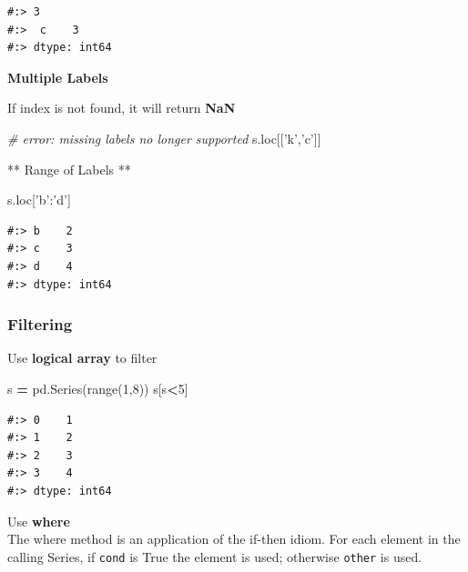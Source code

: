 \documentclass[
]{book}
\newenvironment{Shaded}{\begin{snugshade}}{\end{snugshade}}
\newcommand{\BuiltInTok}[1]{#1}
\newcommand{\CommentTok}[1]{\textcolor[rgb]{0.37,0.37,0.37}{\textit{#1}}}
\newcommand{\DecValTok}[1]{\textcolor[rgb]{0.06,0.06,0.06}{#1}}
\newcommand{\NormalTok}[1]{#1}
\newcommand{\OperatorTok}[1]{\textcolor[rgb]{0.43,0.43,0.43}{\textbf{#1}}}
\newcommand{\StringTok}[1]{\textcolor[rgb]{0.5,0.5,0.5}{#1}}
\begin{document}
\begin{verbatim}
#:> 3 
#:>  c    3
#:> dtype: int64
\end{verbatim}

\textbf{Multiple Labels}

If index is not found, it will return \textbf{NaN}

\begin{Shaded}
\begin{Highlighting}[]
\CommentTok{# error: missing labels no longer supported}
\NormalTok{s.loc[[}\StringTok{'k'}\NormalTok{,}\StringTok{'c'}\NormalTok{]]}
\end{Highlighting}
\end{Shaded}

** Range of Labels **

\begin{Shaded}
\begin{Highlighting}[]
\NormalTok{s.loc[}\StringTok{'b'}\NormalTok{:}\StringTok{'d'}\NormalTok{]}
\end{Highlighting}
\end{Shaded}

\begin{verbatim}
#:> b    2
#:> c    3
#:> d    4
#:> dtype: int64
\end{verbatim}

\hypertarget{filtering}{%
\subsubsection{Filtering}\label{filtering}}

Use \textbf{logical array} to filter

\begin{Shaded}
\begin{Highlighting}[]
\NormalTok{s }\OperatorTok{=}\NormalTok{ pd.Series(}\BuiltInTok{range}\NormalTok{(}\DecValTok{1}\NormalTok{,}\DecValTok{8}\NormalTok{))}
\NormalTok{s[s}\OperatorTok{<}\DecValTok{5}\NormalTok{]}
\end{Highlighting}
\end{Shaded}

\begin{verbatim}
#:> 0    1
#:> 1    2
#:> 2    3
#:> 3    4
#:> dtype: int64
\end{verbatim}

Use \textbf{where}\\
The where method is an application of the if-then idiom. For each element in the calling Series, if \texttt{cond} is True the element is used; otherwise \texttt{other} is used.
\end{document}
